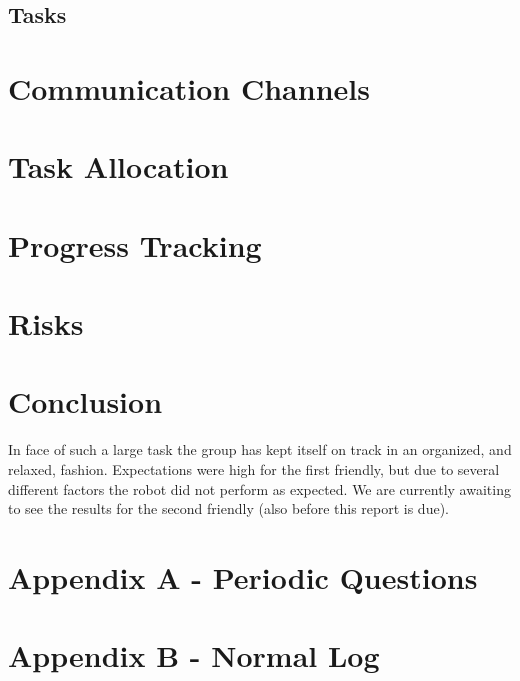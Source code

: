 \documentclass[a4paper,12pt]{article}
\begin{document}
\subsection{Tasks}


\section{Communication Channels}


\section{Task Allocation}


\section{Progress Tracking}


\section{Risks}


\section{Conclusion}
In face of such a large task the group has kept itself on track in an organized, and relaxed, fashion. Expectations were high for the first friendly, but due to several different factors the robot did not perform as expected. We are currently awaiting to see the results for the second friendly (also before this report is due).

\newpage
\section*{Appendix A - Periodic Questions}
\begin{figure}[H]
    \centering
    
    \label{fig:andralog}
\end{figure}
\newpage
\section*{Appendix B - Normal Log}
\begin{figure}[H]
    \centering
    
    \label{fig:veskolog}
\end{figure}
\end{document}

